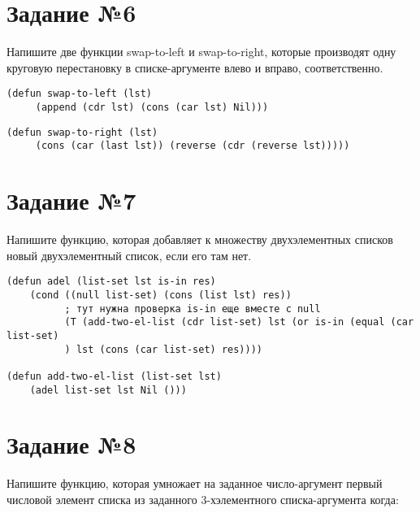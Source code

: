 \section{Задание №6}

Напишите две функции swap-to-left и swap-to-right, которые производят одну
круговую перестановку в списке-аргументе влево и вправо, соответственно.

\vspace{4mm}
\begin{minipage}{0.92\linewidth}
\begin{lstlisting}
(defun swap-to-left (lst)
     (append (cdr lst) (cons (car lst) Nil)))
\end{lstlisting}
\end{minipage}

\vspace{4mm}
\begin{minipage}{0.92\linewidth}
\begin{lstlisting}
(defun swap-to-right (lst)
     (cons (car (last lst)) (reverse (cdr (reverse lst)))))
\end{lstlisting}
\end{minipage}

\section{Задание №7}

Напишите функцию, которая добавляет к множеству двухэлементных списков
новый двухэлементный список, если его там нет.

\vspace{4mm}
\begin{minipage}{0.92\linewidth}
\begin{lstlisting}
(defun adel (list-set lst is-in res)
    (cond ((null list-set) (cons (list lst) res))
          ; тут нужна проверка is-in еще вместе с null
          (T (add-two-el-list (cdr list-set) lst (or is-in (equal (car list-set)
          ) lst (cons (car list-set) res))))

(defun add-two-el-list (list-set lst)
    (adel list-set lst Nil ()))
\end{lstlisting}
\end{minipage}

\section{Задание №8}

Напишите функцию, которая умножает на заданное число-аргумент первый
числовой элемент списка из заданного 3-хэлементного списка-аргумента
когда:

